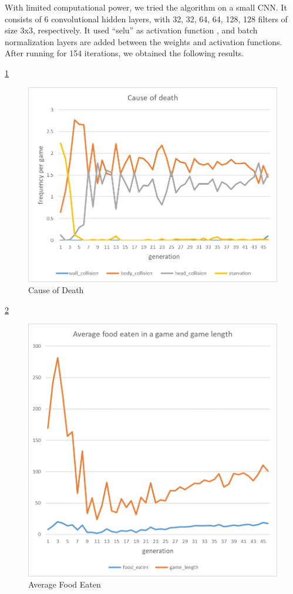 \documentclass{article}
\begin{document}
With limited computational power, we tried the algorithm on a small CNN. It
consists of 6 convolutional hidden layers, with 32, 32, 64, 64, 128, 128 filters
of size 3x3, respectively. It used “selu” as activation function
\cite{SeluPaper}, and batch normalization layers are added between the weights
and activation functions. After running for 154 iterations, we obtained the
following results.

\ref{fig:cause_of_death}

\begin{figure}[!ht]
  \centering
  \includegraphics[width=\linewidth]{cause_of_death}
  \caption{Cause of Death}
  \label{fig:cause_of_death}
\end{figure}

\FloatBarrier

\ref{fig:average_food_eaten}

\begin{figure}[!ht]
  \centering
  \includegraphics[width=\linewidth]{average_food_eaten}
  \caption{Average Food Eaten}
  \label{fig:average_food_eaten}
\end{figure}
\end{document}
